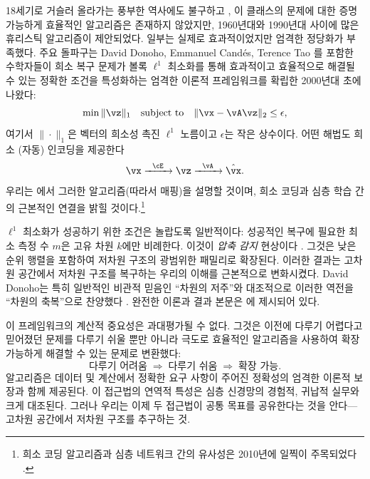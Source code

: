 \documentclass[../../book-main_ko.tex]{subfiles}
\begin{document}
18세기로 거슬러 올라가는 풍부한 역사에도 불구하고 \cite{Boscovichca1750}, 이 클래스의 문제에 대한 증명 가능하게 효율적인 알고리즘은 존재하지 않았지만, 1960년대와 1990년대 사이에 많은 휴리스틱 알고리즘이 제안되었다. 일부는 실제로 효과적이었지만 엄격한 정당화가 부족했다. 주요 돌파구는 David Donoho, Emmanuel Cand\'{e}s, Terence Tao \cite{donoho2005neighborly,Candes2005,CandesE2005-IT}를 포함한 수학자들이 희소 복구 문제가 볼록 \(\ell^{1}\) 최소화를 통해 효과적이고 효율적으로 해결될 수 있는 정확한 조건을 특성화하는 엄격한 이론적 프레임워크를 확립한 2000년대 초에 나왔다:
\begin{equation}
    \min \|\vz\|_{1} \quad \text{subject to} \quad \|\vx - \vA\vz\|_{2} \leq \epsilon,
\end{equation}
여기서 \(\|\cdot\|_{1}\)은 벡터의 희소성 촉진 \(\ell^{1}\) 노름이고 \(\epsilon\)는 작은 상수이다. 어떤 해법도 희소 (자동) 인코딩을 제공한다
\begin{equation}
    \vx \xrightarrow{\hspace{2mm} \cE \hspace{2mm}} \vz \xrightarrow{\hspace{2mm} \vA \hspace{2mm}} \hat{\vx}.
    \label{eqn:decoding-sparse}
\end{equation}
우리는 에서 그러한 알고리즘(따라서 매핑)을 설명할 것이며, 희소 코딩과 심층 학습 간의 근본적인 연결을 밝힐 것이다.\footnote{희소 코딩 알고리즘과 심층 네트워크 간의 유사성은 2010년에 일찍이 주목되었다 \cite{gregor2010learning}.}

\(\ell^{1}\) 최소화가 성공하기 위한 조건은 놀랍도록 일반적이다: 성공적인 복구에 필요한 최소 측정 수 \(m\)은 고유 차원 \(k\)에만 비례한다. 이것이 \textit{압축 감지} 현상이다 \cite{CandesE2006-ICM}. 그것은 낮은 순위 행렬을 포함하여 저차원 구조의 광범위한 패밀리로 확장된다. 이러한 결과는 고차원 공간에서 저차원 구조를 복구하는 우리의 이해를 근본적으로 변화시켰다. David Donoho는 특히 일반적인 비관적 믿음인 ``차원의 저주''와 대조적으로 이러한 역전을 ``차원의 축복''으로 찬양했다 \cite{DonohoD2000}. 완전한 이론과 결과 본문은 \cite{Wright-Ma-2022}에 제시되어 있다.

이 프레임워크의 계산적 중요성은 과대평가될 수 없다. 그것은 이전에 다루기 어렵다고 믿어졌던 문제를 다루기 쉬울 뿐만 아니라 극도로 효율적인 알고리즘을 사용하여 확장 가능하게 해결할 수 있는 문제로 변환했다:
\begin{equation}
    \text{다루기 어려움} \;\Longrightarrow\; \text{다루기 쉬움} \;\Longrightarrow\; \text{확장 가능}.
\end{equation}
알고리즘은 데이터 및 계산에서 정확한 요구 사항이 주어진 정확성의 엄격한 이론적 보장과 함께 제공된다. 이 접근법의 연역적 특성은 심층 신경망의 경험적, 귀납적 실무와 크게 대조된다. 그러나 우리는 이제 두 접근법이 공통 목표를 공유한다는 것을 안다---고차원 공간에서 저차원 구조를 추구하는 것.
\end{document}
